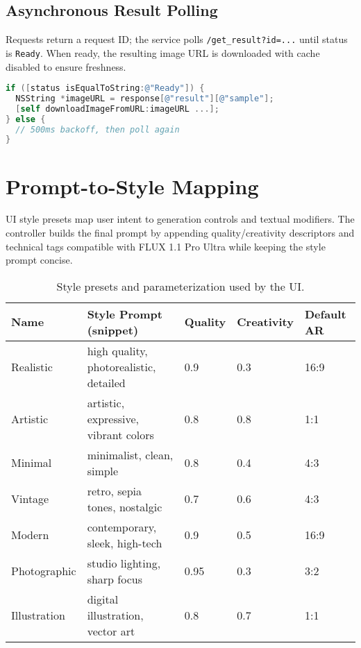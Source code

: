 \subsection{Asynchronous Result Polling}
Requests return a request ID; the service polls \texttt{/get\_result?id=...} until status is \texttt{Ready}. When ready, the resulting image URL is downloaded with cache disabled to ensure freshness.

\begin{lstlisting}[language=C, basicstyle=\ttfamily\small, caption={Polling and retrieval (abridged).}, label={lst:poll}]
if ([status isEqualToString:@"Ready"]) {
  NSString *imageURL = response[@"result"][@"sample"]; 
  [self downloadImageFromURL:imageURL ...];
} else {
  // 500ms backoff, then poll again
}
\end{lstlisting}

\section{Prompt-to-Style Mapping}\label{sec:style-mapping}
UI style presets map user intent to generation controls and textual modifiers. The controller builds the final prompt by appending quality/creativity descriptors and technical tags compatible with FLUX 1.1 Pro Ultra while keeping the style prompt concise.

\begin{table}[H]
\centering
\caption{Style presets and parameterization used by the UI.}
\label{tab:styles}
\begin{tabular}{P{2.7cm} P{4.2cm} P{1.6cm} P{1.8cm} P{1.6cm}}
\toprule
\textbf{Name} & \textbf{Style Prompt (snippet)} & \textbf{Quality} & \textbf{Creativity} & \textbf{Default AR} \\
\midrule
Realistic & high quality, photorealistic, detailed & 0.9 & 0.3 & 16:9 \\
Artistic & artistic, expressive, vibrant colors & 0.8 & 0.8 & 1:1 \\
Minimal & minimalist, clean, simple & 0.8 & 0.4 & 4:3 \\
Vintage & retro, sepia tones, nostalgic & 0.7 & 0.6 & 4:3 \\
Modern & contemporary, sleek, high-tech & 0.9 & 0.5 & 16:9 \\
Photographic & studio lighting, sharp focus & 0.95 & 0.3 & 3:2 \\
Illustration & digital illustration, vector art & 0.8 & 0.7 & 1:1 \\
\bottomrule
\end{tabular}
\end{table}

